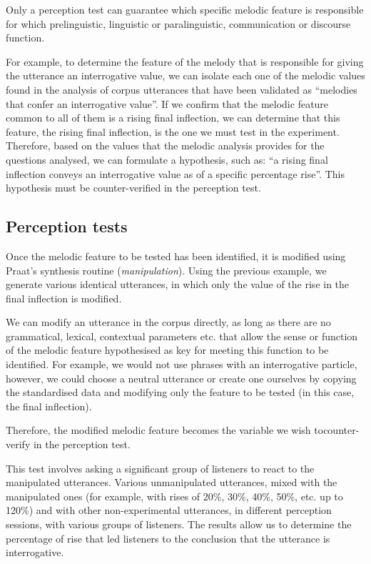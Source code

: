 \documentclass[output=paper]{langscibook}
\begin{document}
Only a perception test can guarantee which specific melodic feature is responsible for which prelinguistic, linguistic or paralinguistic, communication or discourse function.

For example, to determine the feature of the melody that is responsible for giving the utterance an interrogative value, we can isolate each one of the melodic values found in the analysis of corpus utterances that have been validated as ``melodies that confer an interrogative value''. If we confirm that the melodic feature common to all of them is a rising final inflection, we can determine that this feature, the rising final inflection, is the one we must test in the experiment. Therefore, based on the values that the melodic analysis provides for the questions analysed, we can formulate a hypothesis, such as: ``a rising final inflection conveys an interrogative value as of a specific percentage rise''. This hypothesis must be counter-verified in the perception test.

\subsection{Perception tests} 
Once the melodic feature to be tested has been identified, it is modified using Praat's synthesis routine (\textit{manipulation}). Using the previous example, we generate various identical utterances, in which only the value of the rise in the final inflection is modified.

We can modify an utterance in the corpus directly, as long as there are no grammatical, lexical, contextual parameters etc. that allow the sense or function of the melodic feature hypothesised as key for meeting this function to be identified. For example, we would not use phrases with an interrogative particle, however, we could choose a neutral utterance or create one ourselves by copying the standardised data and modifying only the feature to be tested (in this case, the final inflection).

Therefore, the modified melodic feature becomes the variable we wish to\linebreak counter-verify in the perception test. 

This test involves asking a significant group of listeners to react to the manipulated utterances. Various unmanipulated utterances, mixed with the manipulated ones (for example, with rises of 20\%, 30\%, 40\%, 50\%, etc. up to 120\%) and with other non-experimental utterances, in different perception sessions, with various groups of listeners. The results allow us to determine the percentage of rise that led listeners to the conclusion that the utterance is interrogative.
\end{document}
